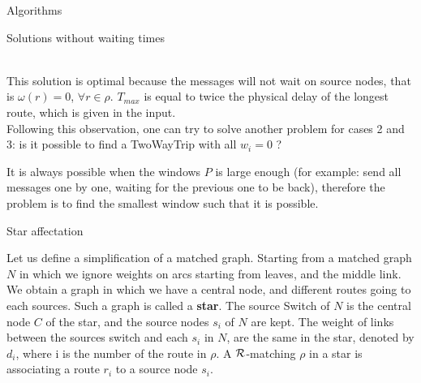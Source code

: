 \documentclass[a4paper,10pt]{report}
\begin{document}
\begin{chapter}{Algorithms}
\begin{section}{Solutions without waiting times}
{{{
 }}}\\

This solution is optimal because the messages will not wait on source nodes, that is $\omega(r) = 0$, $\forall r \in \rho$. $T_{max}$ is
equal to twice the physical delay of the longest route, which is given in the input.\\


Following this observation, one can try to solve another problem for cases 2 and 3: is it possible to find a TwoWayTrip
with all $w_i = 0$ ? 

It is always possible when the windows $P$ is large enough (for example: send all messages one by one, waiting for the previous one to be back),
therefore the problem is to find the smallest window such that it is possible.

\begin{subsection}{Star affectation}
 
Let us define a simplification of a matched graph. 
Starting from a matched graph $N$ in which we ignore weights on arcs starting from leaves, and the middle link.
We obtain a graph in which we have a central node, and different routes going to each sources.
Such a graph is called a {\bf star}.
The source Switch of $N$ is the central node $C$ of the star, and the source nodes $s_i$ of $N$ are kept. 
The weight of links between the sources switch and each $s_i$ in $N$, are the same in the star, denoted by $d_i$, where i is the number of the route in $\rho$. 
A ${\cal R}$-matching $\rho$ in a star is associating a route $r_i$ to a source node $s_i$.\\

\fbox{\parbox{11cm}{

\begin{center}


\end{center}}}
\end{subsection}
\end{section}
\end{chapter}
\end{document}
